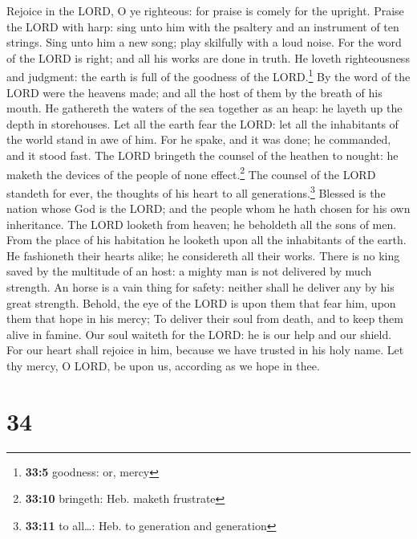  Rejoice in the LORD, O ye righteous: for praise is comely
for the upright.  Praise the LORD with harp: sing unto him
with the psaltery and an instrument of ten strings.  Sing
unto him a new song; play skilfully with a loud noise. 
For the word of the LORD is right; and all his works are done in truth.
 He loveth righteousness and judgment: the earth is full
of the goodness of the LORD.\footnote{\textbf{33:5} goodness: or, mercy}
 By the word of the LORD were the heavens made; and all
the host of them by the breath of his mouth.  He gathereth
the waters of the sea together as an heap: he layeth up the depth in
storehouses.  Let all the earth fear the LORD: let all the
inhabitants of the world stand in awe of him.  For he
spake, and it was done; he commanded, and it stood fast. 
The LORD bringeth the counsel of the heathen to nought: he maketh the
devices of the people of none effect.\footnote{\textbf{33:10} bringeth:
  Heb. maketh frustrate}  The counsel of the LORD
standeth for ever, the thoughts of his heart to all
generations.\footnote{\textbf{33:11} to all\ldots: Heb. to generation
  and generation}  Blessed is the nation whose God is the
LORD; and the people whom he hath chosen for his own inheritance.
 The LORD looketh from heaven; he beholdeth all the sons
of men.  From the place of his habitation he looketh upon
all the inhabitants of the earth.  He fashioneth their
hearts alike; he considereth all their works.  There is
no king saved by the multitude of an host: a mighty man is not delivered
by much strength.  An horse is a vain thing for safety:
neither shall he deliver any by his great strength. 
Behold, the eye of the LORD is upon them that fear him, upon them that
hope in his mercy;  To deliver their soul from death, and
to keep them alive in famine.  Our soul waiteth for the
LORD: he is our help and our shield.  For our heart shall
rejoice in him, because we have trusted in his holy name.
 Let thy mercy, O LORD, be upon us, according as we hope
in thee.

\hypertarget{section-33}{%
\section{34}\label{section-33}}

